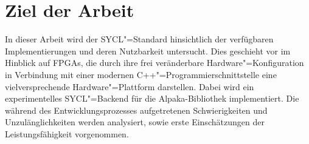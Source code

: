 \section{Ziel der Arbeit}\label{einleitung:ziel}

In dieser Arbeit wird der SYCL"=Standard hinsichtlich der verfügbaren
Implementierungen und deren Nutzbarkeit untersucht. Dies geschieht vor im
Hinblick auf FPGAs, die durch ihre frei veränderbare Hardware"=Konfiguration in
Verbindung mit einer modernen C++"=Programmierschnittstelle eine
vielversprechende Hardware"=Plattform darstellen. Dabei wird ein
experimentelles SYCL"=Backend für die Alpaka-Bibliothek implementiert. Die
während des Entwicklungsprozesses aufgetretenen Schwierigkeiten und
Unzulänglichkeiten werden analysiert, sowie erste Einschätzungen der
Leistungsfähigkeit vorgenommen.
